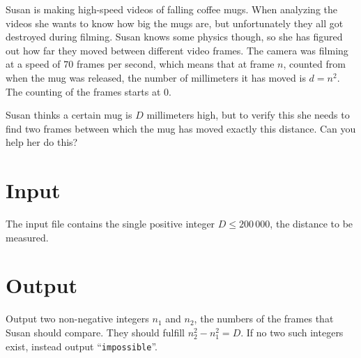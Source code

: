 

\noindent
Susan is making high-speed videos of falling coffee mugs. When analyzing the videos she wants to
know how big the mugs are, but unfortunately they all got destroyed during filming. Susan knows some
physics though, so she has figured out how far they moved between different video frames. The camera
was filming at a speed of $70$ frames per second, which means that at frame $n$, counted from when
the mug was released, the number of millimeters it has moved is $d=n^2$. The counting of the frames
starts at $0$.

Susan thinks a certain mug is $D$ millimeters high, but to verify this she needs to find two frames between which the mug has moved exactly this distance. Can you help her do this?

\section*{Input}
The input file contains the single positive integer $D\leq 200\,000$, the distance to be measured.

\section*{Output}
Output two non-negative integers $n_1$ and $n_2$, the numbers of the frames that Susan should compare. They should fulfill $n_2^2-n_1^2=D$. If no two such integers exist, instead output ``\verb|impossible|''.
